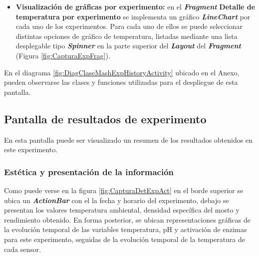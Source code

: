 \begin{itemize}
                 \item \textbf{Visualización de gráficas por experimento:} en el \textbf{\textit{\gls{Fragment}}} \textbf{Detalle de temperatura por experimento} se implementa un gráfico \textbf{\textit{\gls{LineChart}}} por cada uno de los experimentos. Para cada uno de ellos se puede seleccionar distintas opciones de gráfico de temperatura, listadas mediante una lista desplegable tipo \textbf{\textit{\gls{Spinner}}} en la parte superior del \textbf{\textit{\gls{Layout}}} del \textbf{\textit{\gls{Fragment}}} (Figura \ref{fig:CapturaExpFrag}).
             \end{itemize}
             
            \par En el diagrama \ref{fig:DiagClaseMashExpHistoryActivity} ubicado en el Anexo, pueden observarse las clases y funciones utilizadas para el despliegue de esta pantalla.
            
        
        \subsection{Pantalla de resultados de experimento}
        \label{DescripPantallaResultadosExperimento}
            \par En esta pantalla puede ser visualizado un resumen de los resultados obtenidos en este experimento.
        
            \subsubsection{Estética y presentación de la información}
            \par Como puede verse en la figura \ref{fig:CapturaDetExpAct} en el borde superior se ubica un \textbf{\textit{\gls{ActionBar}}} con el la fecha y horario del experimento, debajo se presentan los valores temperatura ambiental, densidad específica del mosto y rendimiento obtenido. En forma posterior, se ubican representaciones gráficas de la evolución temporal de las variables temperatura, pH y activación de enzimas para este experimento, seguidas de la evolución temporal de la temperatura de cada sensor.
            
